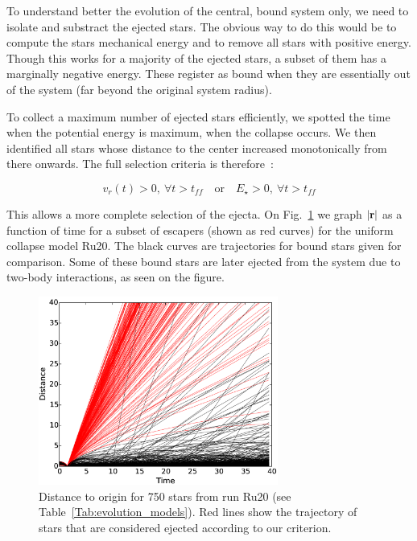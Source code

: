 To understand better the evolution of the central, bound system only, we need to isolate and substract the ejected stars. The obvious way to do this would be to compute the stars mechanical energy and to remove all stars with positive energy. Though this works for a majority of the ejected stars, a subset of them has a marginally negative energy. These register as bound when they are essentially out of the system (far beyond the original system radius). 

To collect a maximum number of ejected stars efficiently, we spotted the time when the potential energy is maximum, when the collapse occurs. We  then identified all stars whose distance to the center increased monotonically from there onwards. The full selection criteria is therefore~:

\begin{equation}
v_r(t) > 0,~\forall t > t_{ff}\quad \textrm{or} \quad  E_\star > 0 , ~\forall t > t_{ff}
\end{equation}
 
This allows a more complete selection of the ejecta.  On Fig.~\ref{Fig:3_DistOrigin} we graph  $|\bold{r}|$  as a function of time for a subset of escapers (shown as red curves) for the uniform collapse model Ru20. The black curves are trajectories for bound stars given for comparison. Some of these bound stars are later ejected from the system due to two-body interactions, as seen on the figure.

\begin{figure}
\begin{center}
\includegraphics[width=0.7\textwidth]{Figures/3_DistOrigin}
\caption{Distance to origin for 750 stars from run Ru20 (see Table~\ref{Tab:evolution_models}). Red lines show the trajectory of stars that are considered ejected according to our criterion.}
\label{Fig:3_DistOrigin}
\end{center}
\end{figure}



